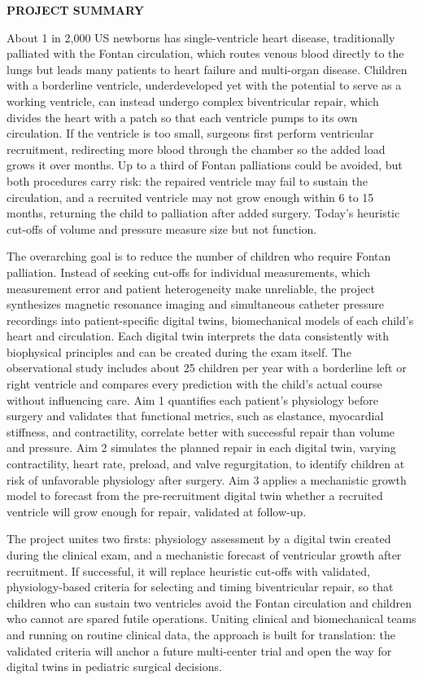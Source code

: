 \documentclass[11pt]{article}
\begin{document}
\linenumbers %

\textbf{PROJECT SUMMARY}

About 1 in 2,000 US newborns has single-ventricle heart disease, traditionally palliated with the Fontan circulation, which routes venous blood directly to the lungs but leads many patients to heart failure and multi-organ disease. Children with a borderline ventricle, underdeveloped yet with the potential to serve as a working ventricle, can instead undergo complex biventricular repair, which divides the heart with a patch so that each ventricle pumps to its own circulation. If the ventricle is too small, surgeons first perform ventricular recruitment, redirecting more blood through the chamber so the added load grows it over months. Up to a third of Fontan palliations could be avoided, but both procedures carry risk: the repaired ventricle may fail to sustain the circulation, and a recruited ventricle may not grow enough within 6 to 15 months, returning the child to palliation after added surgery. Today's heuristic cut-offs of volume and pressure measure size but not function.

The overarching goal is to reduce the number of children who require Fontan palliation. Instead of seeking cut-offs for individual measurements, which measurement error and patient heterogeneity make unreliable, the project synthesizes magnetic resonance imaging and simultaneous catheter pressure recordings into patient-specific digital twins, biomechanical models of each child's heart and circulation. Each digital twin interprets the data consistently with biophysical principles and can be created during the exam itself. The observational study includes about 25 children per year with a borderline left or right ventricle and compares every prediction with the child's actual course without influencing care. Aim 1 quantifies each patient's physiology before surgery and validates that functional metrics, such as elastance, myocardial stiffness, and contractility, correlate better with successful repair than volume and pressure. Aim 2 simulates the planned repair in each digital twin, varying contractility, heart rate, preload, and valve regurgitation, to identify children at risk of unfavorable physiology after surgery. Aim 3 applies a mechanistic growth model to forecast from the pre-recruitment digital twin whether a recruited ventricle will grow enough for repair, validated at follow-up.

The project unites two firsts: physiology assessment by a digital twin created during the clinical exam, and a mechanistic forecast of ventricular growth after recruitment. If successful, it will replace heuristic cut-offs with validated, physiology-based criteria for selecting and timing biventricular repair, so that children who can sustain two ventricles avoid the Fontan circulation and children who cannot are spared futile operations. Uniting clinical and biomechanical teams and running on routine clinical data, the approach is built for translation: the validated criteria will anchor a future multi-center trial and open the way for digital twins in pediatric surgical decisions.
\end{document}
